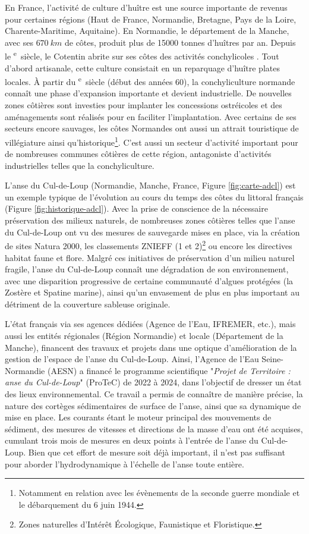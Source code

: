 \documentclass[10pt,a4paper,titlepage]{article}
\def\siecle#1{\textsc{\romannumeral #1}\textsuperscript{e}~siècle}
\begin{document}
    En France, l'activité de culture d'huître est une source importante de revenus pour certaines régions (Haut de France, Normandie, Bretagne, Pays de la Loire, Charente-Maritime, Aquitaine). En Normandie, le département de la Manche, avec ses $670~km$ de côtes, produit plus de \num{15000} tonnes d'huîtres par an. Depuis le \siecle{18}, le Cotentin abrite sur ses côtes des activités conchylicoles \parencite{Kopp2000}. Tout d'abord artisanale, cette culture consistait en un reparquage d'huître plates locales. À partir du \siecle{20} (début des années 60), la conchyliculture normande connaît une phase d'expansion importante et devient industrielle. De nouvelles zones côtières sont investies pour implanter les concessions ostréicoles et des aménagements sont réalisés pour en faciliter l'implantation.
    Avec certains de ses secteurs encore sauvages, les côtes Normandes ont aussi un attrait touristique de villégiature ainsi qu'historique\footnote{Notamment en relation avec les évènements de la seconde guerre mondiale et le débarquement du 6 juin 1944.}.  C'est aussi un secteur d'activité important pour de nombreuses communes côtières de cette région, antagoniste d'activités industrielles telles que la conchyliculture.

    L'anse du Cul-de-Loup (Normandie, Manche, France, Figure \ref{fig:carte-adcl}) est un exemple typique de l'évolution au cours du temps des côtes du littoral français (Figure \ref{fig:historique-adcl}). Avec la prise de conscience de la nécessaire préservation des milieux naturels, de nombreuses zones côtières telles que l'anse du Cul-de-Loup ont vu des mesures de sauvegarde mises en place, via la création de sites Natura 2000, les classements ZNIEFF (1 et 2)\footnote{Zones naturelles d’Intérêt Écologique, Faunistique et Floristique.}  ou encore les directives habitat faune et flore. Malgré ces initiatives de préservation d'un milieu naturel fragile, l'anse du Cul-de-Loup connaît une dégradation de son environnement, avec une disparition progressive de certaine communauté d'algues protégées (la Zostère et Spatine marine), ainsi qu'un envasement de plus en plus important au détriment de la couverture sableuse originale.

    L'état français via ses agences dédiées (Agence de l'Eau, IFREMER, etc.), mais aussi les entités régionales (Région Normandie) et locale (Département de la Manche), financent des travaux et projets dans une optique d'amélioration de la gestion de l'espace de l'anse du Cul-de-Loup. Ainsi, l'Agence de l'Eau Seine-Normandie (AESN) a financé le programme scientifique "\textit{Projet de Territoire : anse du Cul-de-Loup}" (ProTeC) de 2022 à 2024, dans l'objectif de dresser un état des lieux environnemental. Ce travail a permis de connaître de manière précise, la nature des cortèges sédimentaires de surface de l'anse, ainsi que sa dynamique de mise en place. Les courants étant le moteur principal des mouvements de sédiment, des mesures de vitesses et directions de la masse d'eau ont été acquises, cumulant trois mois de mesures en deux points à l'entrée de l'anse du Cul-de-Loup. Bien que cet effort de mesure soit déjà important, il n'est pas suffisant pour aborder l'hydrodynamique à l'échelle de l'anse toute entière.
\end{document}
